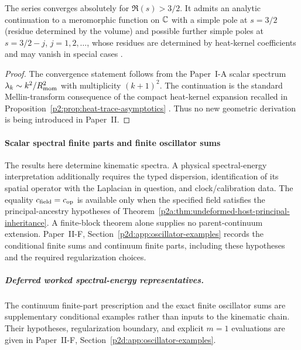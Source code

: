 \documentclass[12pt,a4paper]{article}
\begin{document}
\begin{proposition}
\label{p2:prop:spectral-zeta-continuation}
The series converges absolutely for \(\Re(s) > 3/2\). It admits an analytic continuation to a meromorphic function on \(\mathbb{C}\) with a simple pole at \(s = 3/2\) (residue determined by the volume) and possible further simple poles at \(s=3/2-j\), \(j=1,2,\dots\), whose residues are determined by heat-kernel coefficients and may vanish in special cases \cite{berline1992heat}.
\end{proposition}

\begin{proof}
The convergence statement follows from the Paper~I-A scalar spectrum \(\lambda_k\sim k^2/R_{\mathrm{mom}}^2\) with multiplicity \((k+1)^2\).  The continuation is the standard Mellin-transform consequence of the compact heat-kernel expansion recalled in Proposition~\ref{p2:prop:heat-trace-asymptotics} \cite{berline1992heat}.  Thus no new geometric derivation is being introduced in Paper~II.
\end{proof}


\paragraph{Scalar spectral finite parts and finite oscillator sums}
\label{p2:sec:casimir}

\begin{remark}
\label{p2d:rem:dispersion-speed-boundary}
The results here determine kinematic spectra.
A physical spectral-energy interpretation additionally requires the typed
dispersion, identification of its spatial operator with the Laplacian in
question, and clock/calibration data.
The equality \(c_{\rm field}=c_{\rm op}\) is available only when the
specified field satisfies the principal-ancestry hypotheses of
Theorem~\ref{p2a:thm:undeformed-host-principal-inheritance}.
A finite-block theorem alone supplies no parent-continuum extension.
Paper~II-F, Section~\ref{p2d:app:oscillator-examples} records the conditional
finite sums and continuum finite parts, including these hypotheses and the
required regularization choices.
\end{remark}

\subparagraph{Deferred worked spectral-energy representatives.}
The continuum finite-part prescription and the exact finite oscillator sums
are supplementary conditional examples rather than inputs to the kinematic
chain.  Their hypotheses, regularization boundary, and explicit \(m=1\)
evaluations are given in Paper~II-F, Section~\ref{p2d:app:oscillator-examples}.
\end{document}
